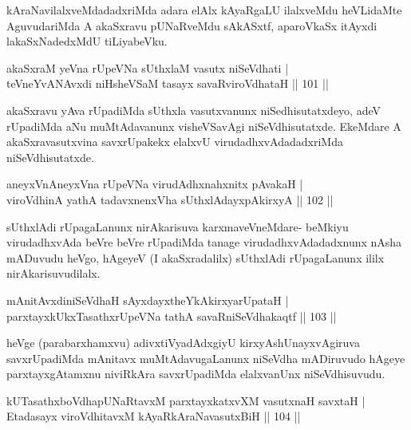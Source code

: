 \begin{artha}
kAraNavilalxveMdadadxriMda adara elAlx kAyaRgaLU ilalxveMdu heVLidaMte AguvudariMda A akaSxravu pUNaRveMdu sAkASxtf, aparoVkaSx itAyxdi lakaSxNadedxMdU tiLiyabeVku.
\end{artha}

\begin{shl}
akaSxraM yeVna rUpeVNa sUthxlaM vasutx niSeVdhati |\\
teVneYvANAvxdi niHsheVSaM tasayx savaRviroVdhataH \hfill || 101 ||
\end{shl}

\begin{artha}
akaSxravu yAva rUpadiMda sUthxla vasutxvanunx niSedhisutatxdeyo, adeV rUpadiMda aNu muMtAdavanunx visheVSavAgi niSeVdhisutatxde. EkeMdare A akaSxravasutxvina savxrUpakekx elalxvU virudadhxvAdadadxriMda niSeVdhisutatxde.
\end{artha}

\begin{shl}
aneyxVnAneyxVna rUpeVNa virudAdhxnahxnitx pAvakaH |\\
viroVdhinA yathA tadavxnenxVha sUthxlAdayxpAkirxyA \hfill || 102 ||
\end{shl}

\begin{artha}%
sUthxlAdi rUpagaLanunx nirAkarisuva karxmaveVneMdare- beMkiyu virudadhxvAda beVre beVre rUpadiMda tanage virudadhxvAdadadxnunx nAsha mADuvudu heVgo, hAgeyeV (I akaSxradalilx) sUthxlAdi rUpagaLanunx ililx nirAkarisuvudilalx.
\end{artha}

\begin{shl}
mAnitAvxdiniSeVdhaH sAyxdayxtheYkAkirxyarUpataH |\\
parxtayxkUkxTasathxrUpeVNa tathA savaRniSeVdhakaqtf \hfill || 103 ||
\end{shl}

\begin{artha}
heVge (parabarxhamxvu) adivxtiVyadAdxgiyU kirxyAshUnayxvAgiruva savxrUpadiMda mAnitavx muMtAdavugaLanunx niSeVdha mADiruvudo hAgeye parxtayxgAtamxnu niviRkAra savxrUpadiMda elalxvanUnx niSeVdhisuvudu.
\end{artha}


\begin{shl}
kUTasathxboVdhapUNaRtavxM parxtayxkatxvXM vasutxnaH savxtaH |\\
Etadasayx viroVdhitavxM kAyaRkAraNavasutxBiH \hfill || 104 ||
\end{shl}

